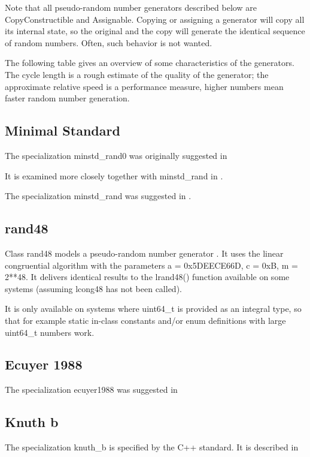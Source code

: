 \vspace{0.3cm}
Note that all pseudo-random number generators described below are CopyConstructible and Assignable. Copying or 
assigning a generator will copy all its internal state, so the original and the copy will generate the identical sequence of 
random numbers. Often, such behavior is not wanted. 

The following table gives an overview of some characteristics of the generators. The cycle length is a rough estimate of 
the quality of the generator; the approximate relative speed is a performance measure, higher numbers mean faster random 
number generation.  

\subsection{Minimal Standard}
The specialization minstd\_rand0 was originally suggested in \cite{Lewis_1969}

It is examined more closely together with minstd\_rand in \cite{Park_1988}.


The specialization minstd\_rand was suggested in \cite{Park_1988}.


\subsection{rand48}
Class rand48 models a pseudo-random number generator . It uses the linear congruential algorithm with the parameters a = 0x5DEECE66D, c = 0xB, m = 2**48. It delivers identical results to the lrand48() function available on some systems (assuming lcong48 has not been called).

It is only available on systems where uint64\_t is provided as an integral type, so that for example static in-class constants and/or enum definitions with large uint64\_t numbers work. 




\subsection{Ecuyer 1988}
The specialization ecuyer1988 was suggested in \cite{LEcuyer_1988}




\subsection{Knuth b}
The specialization knuth\_b is specified by the C++ standard. It is described in \cite{Knuth_1981}



